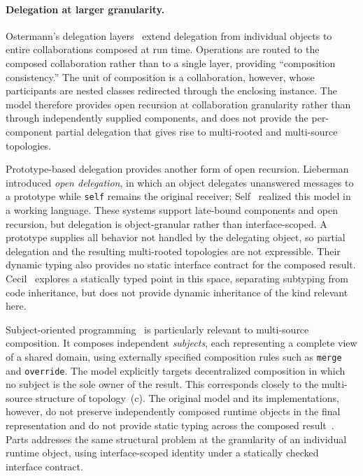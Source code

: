 \documentclass[acmsmall,screen,review,anonymous]{acmart}
\theoremstyle{acmplain}
\newcommand{\code}[1]{\texttt{#1}}
\begin{document}
\paragraph{Delegation at larger granularity.}
Ostermann's delegation layers~\cite{ostermann2002} extend delegation from
individual objects to entire collaborations composed at run time. Operations
are routed to the composed collaboration rather than to a single layer,
providing ``composition consistency.'' The unit of composition is a
collaboration, however, whose participants are nested classes redirected
through the enclosing instance. The model therefore provides open recursion
at collaboration granularity rather than through independently supplied
components, and does not provide the per-component partial delegation that
gives rise to multi-rooted and multi-source topologies.

Prototype-based delegation provides another form of open recursion.
Lieberman~\cite{lieberman1986} introduced \emph{open delegation}, in which
an object delegates unanswered messages to a prototype while \code{self}
remains the original receiver; Self~\cite{self1987} realized this model in a
working language. These systems support late-bound components and open
recursion, but delegation is object-granular rather than interface-scoped.
A prototype supplies all behavior not handled by the delegating object, so
partial delegation and the resulting multi-rooted topologies are not
expressible. Their dynamic typing also provides no static interface contract
for the composed result. Cecil~\cite{chambers1993} explores a statically typed
point in this space, separating subtyping from code inheritance, but does not
provide dynamic inheritance of the kind relevant here.

Subject-oriented programming~\cite{harrison1993,ossher1995} is particularly
relevant to multi-source composition. It composes independent
\emph{subjects}, each representing a complete view of a shared domain, using
externally specified composition rules such as \code{merge} and
\code{override}. The model explicitly targets decentralized composition in
which no subject is the sole owner of the result. This corresponds closely to
the multi-source structure of topology~(c). The original model and its
implementations, however, do not preserve independently composed runtime
objects in the final representation and do not provide static typing across
the composed result~\cite{ossher1995}. Parts addresses the same structural
problem at the granularity of an individual runtime object, using
interface-scoped identity under a statically checked interface contract.
\end{document}
